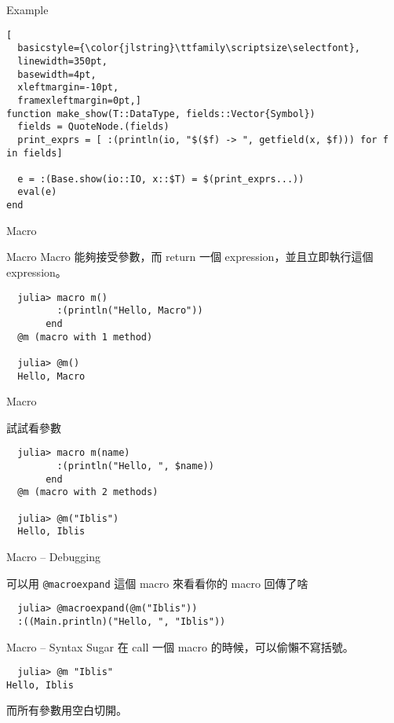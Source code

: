 \documentclass[14pt]{beamer}
\begin{document}
\begin{frame}[fragile]{Example}

\begin{lstlisting}[
  basicstyle={\color{jlstring}\ttfamily\scriptsize\selectfont},
  linewidth=350pt,
  basewidth=4pt,
  xleftmargin=-10pt,
  framexleftmargin=0pt,]
function make_show(T::DataType, fields::Vector{Symbol})
  fields = QuoteNode.(fields)
  print_exprs = [ :(println(io, "$($f) -> ", getfield(x, $f))) for f in fields]

  e = :(Base.show(io::IO, x::$T) = $(print_exprs...))
  eval(e)
end
\end{lstlisting}
\end{frame}


\begin{frame}[c]{}
  \centering
  \huge
  Macro
\end{frame}


\begin{frame}[fragile]{Macro}
  Macro 能夠接受參數，而 return 一個 expression，並且\alert{立即執行}這個 expression。

  \pause

\begin{lstlisting}
  julia> macro m()
         :(println("Hello, Macro"))
       end
  @m (macro with 1 method)

  julia> @m()
  Hello, Macro
\end{lstlisting}
\end{frame}


\begin{frame}[fragile]{Macro}

  試試看參數

\begin{lstlisting}
  julia> macro m(name)
         :(println("Hello, ", $name))
       end
  @m (macro with 2 methods)

  julia> @m("Iblis")
  Hello, Iblis
\end{lstlisting}
\end{frame}


\begin{frame}[fragile]{Macro -- Debugging}

  可以用 \texttt{@macroexpand} 這個 macro 來看看你的 macro 回傳了啥

\begin{lstlisting}
  julia> @macroexpand(@m("Iblis"))
  :((Main.println)("Hello, ", "Iblis"))
\end{lstlisting}
\end{frame}


\begin{frame}[fragile]{Macro -- Syntax Sugar}
  在 call 一個 macro 的時候，可以偷懶不寫括號。

\begin{lstlisting}
  julia> @m "Iblis"
Hello, Iblis
\end{lstlisting}

  而所有參數用空白切開。
\end{frame}
\end{document}
